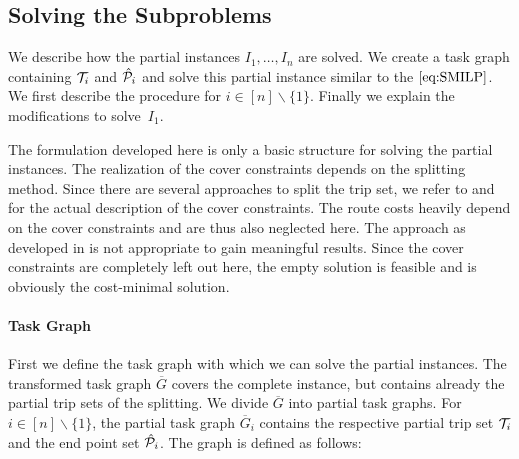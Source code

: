 \subsection{Solving the Subproblems}
\label{sec:heuristic_solving_subproblems}

We describe how the partial instances ${I_1,\dots,I_n}$ are solved. We create a task graph containing $\mathcal{T}_i$ and $\hat{\mathcal{P}}_i$ and solve this partial instance similar to the $\eqref{eq:SMILP}$. We first describe the procedure for ${i\in[n]\backslash\{1\}}$. Finally we explain the modifications to solve~$I_1$.

\begin{remark}

The formulation developed here is only a basic structure for solving the partial instances. The realization of the cover constraints depends on the splitting method. Since there are several approaches to split the trip set, we refer to  and  for the actual description of the cover constraints. The route costs heavily depend on the cover constraints and are thus also neglected here. The approach as developed in  is not appropriate to gain meaningful results. Since the cover constraints are completely left out here, the empty solution is feasible and is obviously the cost-minimal solution.

\end{remark}

\paragraph{Task Graph} \parfill

First we define the task graph with which we can solve the partial instances. The transformed task graph $\overline{G}$ covers the complete instance, but contains already the partial trip sets of the splitting. We divide $\overline{G}$ into partial task graphs. For ${i\in[n]\backslash\{1\}}$, the partial task graph $\overline{G}_i$ contains the respective partial trip set $\mathcal{T}_i$ and the end point set $\hat{\mathcal{P}}_i$. The graph is defined as follows:

